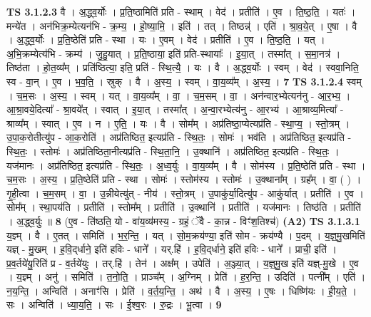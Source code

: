 \documentclass[17pt]{extarticle}
\begin{document}
                  \newline
                                \textbf{ TS 3.1.2.3} \newline
                  वै । अ॒द्ध्व॒र्योः । प्र॒ति॒ष्ठामिति॑ प्रति - स्थाम् । वेद॑ । प्रतीति॑ । ए॒व । ति॒ष्ठ॒ति॒ । यतः॑ । मन्ये॑त । अन॑भिक्र॒म्येत्यन॑भि - क्र॒म्य॒ । हो॒ष्या॒मि॒ । इति॑ । तत् । तिष्ठन्न्॑ । एति॑ । श्रा॒व॒ये॒त् । ए॒षा । वै । अ॒द्ध्व॒र्योः । प्र॒ति॒ष्ठेति॑ प्रति - स्था । यः । ए॒वम् । वेद॑ । प्रतीति॑ । ए॒व । ति॒ष्ठ॒ति॒ । यत् । अ॒भि॒क्रम्येत्य॑भि - क्रम्य॑ । जु॒हु॒यात् । प्र॒ति॒ष्ठाया॒ इति॑ प्रति-स्थायाः᳚ । इ॒या॒त् । तस्मा᳚त् । स॒मा॒नत्र॑ । तिष्ठ॑ता । हो॒त॒व्य᳚म् । प्रति॑ष्ठित्या॒ इति॒ प्रति॑ - स्थि॒त्यै॒ । यः । वै । अ॒द्ध्व॒र्योः । स्वम् । वेद॑ । स्ववा॒निति॒ स्व - वा॒न् । ए॒व । भ॒व॒ति॒ । स्रुक् । वै । अ॒स्य॒ । स्वम् । वा॒य॒व्य᳚म् । अ॒स्य॒ । \textbf{  7} \newline
                  \newline
                                \textbf{ TS 3.1.2.4} \newline
                  स्वम् । च॒म॒सः । अ॒स्य॒ । स्वम् । यत् । वा॒य॒व्य᳚म् । वा॒ । च॒म॒सम् । वा॒ । अन॑न्वार॒भ्येत्यन॑नु - आ॒र॒भ्य॒ । आ॒श्रा॒वये॒दित्या᳚ - श्रा॒वये᳚त् । स्वात् । इ॒या॒त् । तस्मा᳚त् । अ॒न्वा॒रभ्येत्य॑नु - आ॒रभ्य॑ । आ॒श्राव्य॒मित्या᳚ - श्राव्य᳚म् । स्वात् । ए॒व । न । ए॒ति॒ । यः । वै । सोम᳚म् । अप्र॑तिष्ठा॒प्येत्यप्र॑ति - स्था॒प्य॒ । स्तो॒त्रम् । उ॒पा॒क॒रोतीत्यु॑प - आ॒क॒रोति॑ । अप्र॑तिष्ठित॒ इत्यप्र॑ति - स्थि॒तः॒ । सोमः॑ । भव॑ति । अप्र॑तिष्ठित॒ इत्यप्र॑ति - स्थि॒तः॒ । स्तोमः॑ । अप्र॑तिष्ठिता॒नीत्यप्र॑ति - स्थि॒ता॒नि॒ । उ॒क्थानि॑ । अप्र॑तिष्ठित॒ इत्यप्र॑ति - स्थि॒तः॒ । यज॑मानः । अप्र॑तिष्ठित॒ इत्यप्र॑ति - स्थि॒तः॒ । अ॒ध्व॒र्युः । वा॒य॒व्य᳚म् । वै । सोम॑स्य । प्र॒ति॒ष्ठेति॑ प्रति - स्था । च॒म॒सः । अ॒स्य॒ । प्र॒ति॒ष्ठेति॑ प्रति - स्था । सोमः॑ । स्तोम॑स्य । स्तोमः॑ । उ॒क्थाना᳚म् । ग्रह᳚म् । वा॒ ( ) । गृ॒ही॒त्वा । च॒म॒सम् । वा॒ । उ॒न्नीयेत्यु॑त् - नीय॑ । स्तो॒त्रम् । उ॒पाकु॑र्या॒दित्यु॑प - आकु॑र्यात् । प्रतीति॑ । ए॒व । सोम᳚म् । स्था॒पय॑ति । प्रतीति॑ । स्तोम᳚म् । प्रतीति॑ । उ॒क्थानि॑ । प्रतीति॑ । यज॑मानः । तिष्ठ॑ति । प्रतीति॑ । अ॒द्ध्व॒र्युः ॥ \textbf{  8 } \newline
                  \newline
                      (ए॒व - ति॑ष्ठति॒ यो - वा॑य॒व्य॑मस्य॒ - ग्रहं॒ ॅवै - का॒न्न - विꣳ॑श॒तिश्च॑)  \textbf{(A2)} \newline \newline
                                \textbf{ TS 3.1.3.1} \newline
                  य॒ज्ञ्म् । वै । ए॒तत् । समिति॑ । भ॒र॒न्ति॒ । यत् । सो॒म॒क्रय॑ण्या॒ इति॑ सोम - क्रय॑ण्यै । प॒दम् । य॒ज्ञ्॒मु॒खमिति॑ यज्ञ् - मु॒खम् । ह॒वि॒द्‌र्धाने॒ इति॑ हविः - धाने᳚ । यर्.हि॑ । ह॒वि॒द्‌र्धाने॒ इति॑ हविः - धाने᳚ । प्राची॒ इति॑ । प्र॒व॒र्तये॑यु॒रिति॑ प्र - व॒र्तये॑युः । तर्.हि॑ । तेन॑ । अक्ष᳚म् । उपेति॑ । अ॒ञ्ज्या॒त् । य॒ज्ञ्॒मु॒ख इति॑ यज्ञ्-मु॒खे । ए॒व । य॒ज्ञ्म् । अनु॑ । समिति॑ । त॒नो॒ति॒ । प्राञ्च᳚म् । अ॒ग्निम् । प्रेति॑ । ह॒र॒न्ति॒ । उदिति॑ । पत्नी᳚म् । एति॑ । न॒य॒न्ति॒ । अन्विति॑ । अनाꣳ॑सि । प्रेति॑ । व॒र्त॒य॒न्ति॒ । अथ॑ । वै । अ॒स्य॒ । ए॒षः । धिष्णि॑यः । ही॒य॒ते॒ । सः । अन्विति॑ । ध्या॒य॒ति॒ । सः । ई॒श्व॒रः । रु॒द्रः । भू॒त्वा । \textbf{  9} \newline
\end{document}

